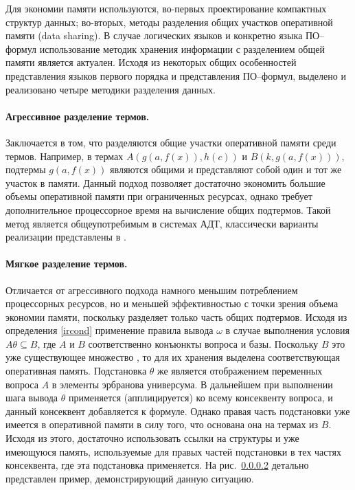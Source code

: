 Для экономии памяти используются, во-первых проектирование компактных структур данных; во-вторых, методы разделения общих участков оперативной памяти (data sharing). В случае логических языков и конкретно языка ПО--формул использование методик хранения информации с разделением общей памяти является актуален. Исходя из некоторых общих особенностей представления языков первого порядка и представления ПО--формул, выделено и реализовано четыре методики разделения данных.


\paragraph{Агрессивное разделение термов.} Заключается в том, что разделяются общие участки оперативной памяти среди термов. Например, в термах $A(g(a,f(x)),h(c))$ и $B(k,g(a,f(x)))$, подтермы $g(a,f(x))$ являются общими и представляют собой один и тот же участок в памяти. Данный подход позволяет достаточно экономить большие объемы оперативной памяти при ограниченных ресурсах, однако требует дополнительное процессорное время на вычисление общих подтермов. Такой метод является общеупотребимым в системах АДТ, классически варианты реализации представлены в \cite{}.

\paragraph{Мягкое разделение термов.} Отличается от агрессивного подхода намного меньшим потреблением процессорных ресурсов, но и меньшей эффективностью с точки зрения объема экономии памяти,
поскольку разделяет только часть общих подтермов. Исходя из определения \ref{ircond} применение правила вывода $\omega$  в случае выполнения условия $A\theta \subseteq B$, где $A$ и $B$ соответственно конъюнкты вопроса и базы. Поскольку $B$ это уже существующее множество , то для их хранения выделена соответствующая оперативная память. Подстановка $\theta$ же является отображением переменных вопроса $A$ в элементы эрбранова универсума. В дальнейшем при выполнении шага вывода $\theta$ применяется (апплицируется) ко всему консеквенту вопроса, и данный консеквент добавляется к формуле. Однако правая часть подстановки уже имеется в оперативной памяти в силу того, что основана она на термах из $B$. Исходя из этого, достаточно использовать ссылки на структуры и уже имеющуюся память, используемые для правых частей подстановки в тех частях консеквента, где эта подстановка применяется. На рис.~\ref{} детально представлен пример, демонстрирующий данную ситуацию.

